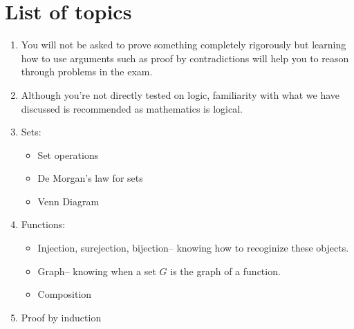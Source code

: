 \documentclass[12pt]{amsart}
\begin{document}
\section*{List of topics}

\begin{enumerate}
    \item You will not be asked to prove something completely rigorously but
    learning how to use arguments such as proof by contradictions will help
    you to reason through problems in the exam.

    \item Although you're not directly tested on logic, 
        familiarity with what we have discussed is recommended 
        as mathematics is logical.

    \item Sets:
        \begin{itemize}
            \item Set operations
            \item De Morgan's law for sets
            \item Venn Diagram
        \end{itemize}

    \item Functions:
        \begin{itemize}
            \item Injection, surejection, bijection-- knowing how to recoginize these objects.
            \item Graph-- knowing when a set $G$ is the graph of a function.
            \item Composition
        \end{itemize}

    \item Proof by induction
\end{enumerate}
\end{document}
